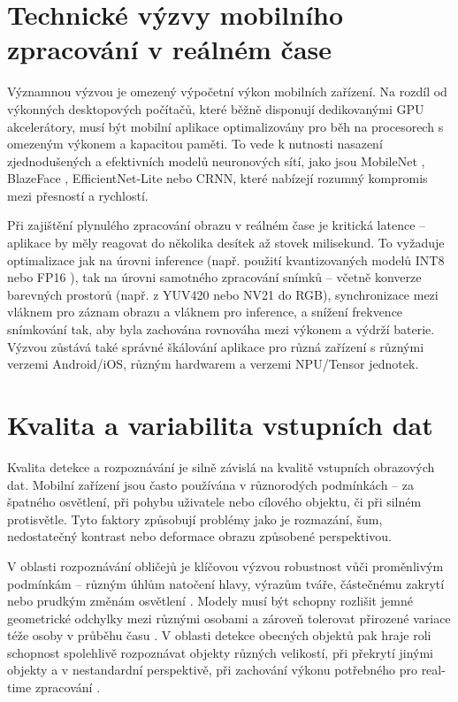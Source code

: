 \documentclass[FM,BP,CZ]{tulthesis}
\begin{document}
\section{Technické výzvy mobilního zpracování v reálném čase}
Významnou výzvou je omezený výpočetní výkon mobilních zařízení. Na rozdíl od výkonných desktopových počítačů, které běžně disponují dedikovanými GPU akcelerátory, musí být mobilní aplikace optimalizovány pro běh na procesorech s omezeným výkonem a kapacitou paměti. To vede k nutnosti nasazení zjednodušených a efektivních modelů neuronových sítí, jako jsou MobileNet \cite{howard2017mobilenets}, BlazeFace \cite{bazarevsky2019blazeface}, EfficientNet-Lite nebo CRNN, které nabízejí rozumný kompromis mezi přesností a rychlostí.

Při zajištění plynulého zpracování obrazu v reálném čase je kritická latence – aplikace by měly reagovat do několika desítek až stovek milisekund. To vyžaduje optimalizace jak na úrovni inference (např. použití kvantizovaných modelů INT8 nebo FP16 \cite{tensorflow2015whitepaper}), tak na úrovni samotného zpracování snímků – včetně konverze barevných prostorů (např. z YUV420 nebo NV21 do RGB), synchronizace mezi vláknem pro záznam obrazu a vláknem pro inference, a snížení frekvence snímkování tak, aby byla zachována rovnováha mezi výkonem a výdrží baterie. Výzvou zůstává také správné škálování aplikace pro různá zařízení s různými verzemi Android/iOS, různým hardwarem a verzemi NPU/Tensor jednotek.

\section{Kvalita a variabilita vstupních dat}
Kvalita detekce a rozpoznávání je silně závislá na kvalitě vstupních obrazových dat. Mobilní zařízení jsou často používána v různorodých podmínkách – za špatného osvětlení, při pohybu uživatele nebo cílového objektu, či při silném protisvětle. Tyto faktory způsobují problémy jako je rozmazání, šum, nedostatečný kontrast nebo deformace obrazu způsobené perspektivou.

V oblasti rozpoznávání obličejů je klíčovou výzvou robustnost vůči proměnlivým podmínkám – různým úhlům natočení hlavy, výrazům tváře, částečnému zakrytí nebo prudkým změnám osvětlení \cite{wang2021survey}. Modely musí být schopny rozlišit jemné geometrické odchylky mezi různými osobami a zároveň tolerovat přirozené variace téže osoby v průběhu času \cite{wang2021survey}. V oblasti detekce obecných objektů pak hraje roli schopnost spolehlivě rozpoznávat objekty různých velikostí, při překrytí jinými objekty a v nestandardní perspektivě, při zachování výkonu potřebného pro real-time zpracování \cite{redmon2016yolo}.
\end{document}
